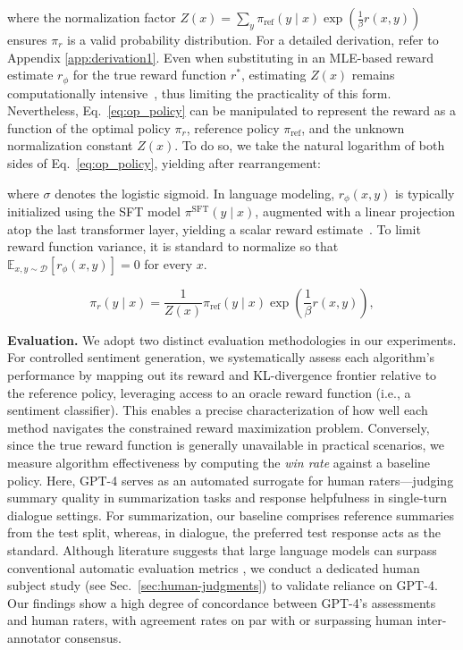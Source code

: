where the normalization factor $Z(x) =\sum_{y}\pi_\text{ref}(y\mid x)\exp\left(\frac{1}{\beta}r(x, y)\right)$ ensures $\pi_r$ is a valid probability distribution. For a detailed derivation, refer to Appendix \ref{app:derivation1}. Even when substituting in an MLE-based reward estimate $r_{\phi}$ for the true reward function $r^*$, estimating $Z(x)$ remains computationally intensive~\citep{korbak2022reinforcement, go2023aligning}, thus limiting the practicality of this form. Nevertheless, Eq.~\ref{eq:op_policy} can be manipulated to represent the reward as a function of the optimal policy $\pi_r$, reference policy $\pi_\text{ref}$, and the unknown normalization constant $Z(x)$. To do so, we take the natural logarithm of both sides of Eq.~\ref{eq:op_policy}, yielding after rearrangement:

where $\sigma$ denotes the logistic sigmoid. In language modeling, $r_{\phi}(x, y)$ is typically initialized using the SFT model $\pi^\text{SFT}(y \mid x)$, augmented with a linear projection atop the last transformer layer, yielding a scalar reward estimate~\cite{ziegler2020finetuning}. To limit reward function variance, it is standard to normalize so that $\mathbb{E}_{x,y\sim \mathcal{D}}\left[r_\phi(x, y)\right] = 0$ for every $x$.

\begin{equation}\label{eq:op_policy}
    \pi_r(y\mid x) = \frac{1}{Z(x)}\pi_\text{ref}(y\mid x)\exp\left(\frac{1}{\beta}r(x, y)\right),
\end{equation}

\textbf{Evaluation.} We adopt two distinct evaluation methodologies in our experiments. For controlled sentiment generation, we systematically assess each algorithm’s performance by mapping out its reward and KL-divergence frontier relative to the reference policy, leveraging access to an oracle reward function (i.e., a sentiment classifier). This enables a precise characterization of how well each method navigates the constrained reward maximization problem. Conversely, since the true reward function is generally unavailable in practical scenarios, we measure algorithm effectiveness by computing the \textit{win rate} against a baseline policy. Here, GPT-4 serves as an automated surrogate for human raters—judging summary quality in summarization tasks and response helpfulness in single-turn dialogue settings. For summarization, our baseline comprises reference summaries from the test split, whereas, in dialogue, the preferred test response acts as the standard. Although literature suggests that large language models can surpass conventional automatic evaluation metrics \citep{Chen2023ExploringTU}, we conduct a dedicated human subject study (see Sec.~\ref{sec:human-judgments}) to validate reliance on GPT-4. Our findings show a high degree of concordance between GPT-4’s assessments and human raters, with agreement rates on par with or surpassing human inter-annotator consensus.

